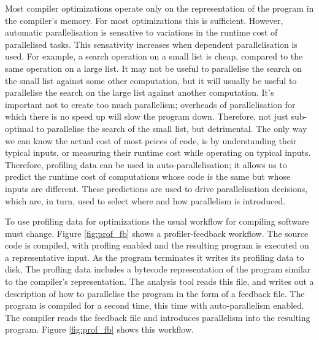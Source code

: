 Most compiler optimizations operate only on the representation of the program
in the compiler's memory.
For most optimizations this is sufficient.
However,
automatic parallelisation is sensative to variations in the runtime cost of
parallelised tasks.
This sensativity increases when dependent parallelisation is used.
For example,
a search operation on a small list is cheap, compared to the same operation on
a large list.
It may not be useful to parallelise the search on the small list against some
other computation,
but it will usually be useful to parallelise the search on the large list
against another computation.
It's important not to create too much parallelism;
overheads of parallelisation for which there is no speed up will slow the
program down.
Therefore, not just sub-optimal to parallelise the search of the small list,
but detrimental.
The only way we can know the actual cost of most peices of code,
is by understanding their typical inputs,
or measuring their runtime cost while operating on typical inputs.
Therefore,
profiling data can be used in auto-parallelisation;
it allows us to predict the runtime cost of computations whose
code is the same but whose inputs are different.
These predictions are used to drive parallelisation decisions,
which are, in turn, used to select where and how parallelism is introduced.


To use profiling data for optimizations the usual workflow for compiling
software must change.
Figure \ref{fig:prof_fb} shows a profiler-feedback workflow.
The source code is compiled, with profling enabled and the resulting program is
executed on a representative input.
As the program terminates it writes its profiling data to disk,
The profling data includes a bytecode representation of the program
similar to the compiler's representation.
The analysis tool reads this file,
and writes out a description of how to parallelise the program in the form of a
feedback file.
The program is compiled for a second time,
this time with auto-parallelism enabled.
The compiler reads the feedback file and introduces parallelism into the
resulting program.
Figure \ref{fig:prof_fb} shows this workflow.

